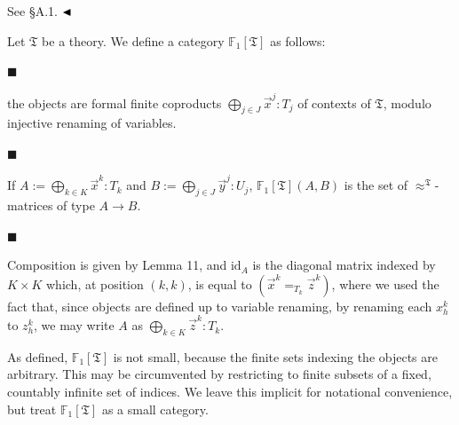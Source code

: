  
See §A.1. $\hfill\blacktriangleleft$\par
 
 
 
Let $\mathfrak{T}$ be a theory. We define a category $\mathbb{F}_{1}[\mathfrak{T}]$ as follows:\par
  
\par\noindent  $\blacksquare$ 
 
the objects are formal finite coproducts $\bigoplus_{j\in J}\vec{x}^{j}:T_{j}$ of contexts of $\mathfrak{T}$, modulo injective renaming of variables.\par
 
 
 
\par\noindent  $\blacksquare$ 
 
If $A:=\bigoplus_{k\in K}\vec{x}^{k}:T_{k}$ and $B:=\bigoplus_{j\in J}\vec{y}^{j}:U_{j}$, $\mathbb{F}_{1}[\mathfrak{T}](A,B)$ is the set of $\approx^{\mathfrak{T}}$-matrices of type $A\to B$.\par
 
 
 
\par\noindent  $\blacksquare$ 
 
Composition is given by Lemma 11, and $\mathrm{id}_{A}$ is the diagonal matrix indexed by $K\times K$ which, at position $(k,k)$, is equal to $(\vec{x}^{k}=_{T_{k}}\vec{z}^{k})$, where we used the fact that, since objects are defined up to variable renaming, by renaming each $x^{k}_{h}$ to $z^{k}_{h}$, we may write $A$ as $\bigoplus_{k\in K}\vec{z}^{k}:T_{k}$.\par
 
 
  
As defined, $\mathbb{F}_{1}[\mathfrak{T}]$ is not small, because the finite sets indexing the objects are arbitrary. This may be circumvented by restricting to finite subsets of a fixed, countably infinite set of indices. We leave this implicit for notational convenience, but treat $\mathbb{F}_{1}[\mathfrak{T}]$ as a small category.\par
 
 
 
